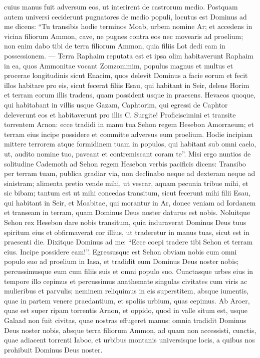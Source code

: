 \begin{biblechapter}
\verse cuius manus fuit adversum eos, ut interirent de castrorum medio. 
\verse Postquam autem universi ceciderunt pugnatores de medio populi, 
\verse locutus est Dominus ad me dicens: 
\verse “Tu transibis hodie terminos Moab, urbem nomine Ar; 
\verse et accedens in vicina filiorum Ammon, cave, ne pugnes contra eos nec movearis ad proelium; non enim dabo tibi de terra filiorum Ammon, quia filiis Lot dedi eam in possessionem. 
\verse — Terra Raphaim reputata est et ipsa olim habitaverunt Raphaim in ea, quos Ammonitae vocant Zomzommim, 
\verse populus magnus et multus et procerae longitudinis sicut Enacim, quos delevit Dominus a facie eorum et fecit illos habitare pro eis, 
\verse sicut fecerat filiis Esau, qui habitant in Seir, delens Horim et terram eorum illis tradens, quam possident usque in praesens. 
\verse Hevaeos quoque, qui habitabant in villis usque Gazam, Caphtorim, qui egressi de Caphtor deleverunt eos et habitaverunt pro illis C.  
\verse Surgite! Proficiscimini et transite torrentem Arnon: ecce tradidi in manu tua Sehon regem Hesebon Amorraeum; et terram eius incipe possidere et committe adversus eum proelium. 
\verse Hodie incipiam mittere terrorem atque formidinem tuam in populos, qui habitant sub omni caelo, ut, audito nomine tuo, paveant et contremiscant coram te”. 
\verse Misi ergo nuntios de solitudine Cademoth ad Sehon regem Hesebon verbis pacificis dicens: 
\verse Transibo per terram tuam, publica gradiar via, non declinabo neque ad dexteram neque ad sinistram; 
\verse alimenta pretio vende mihi, ut vescar, aquam pecunia tribue mihi, et sic bibam; tantum est ut mihi concedas transitum, 
\verse sicut fecerunt mihi filii Esau, qui habitant in Seir, et Moabitae, qui morantur in Ar, donec veniam ad Iordanem et transeam in terram, quam Dominus Deus noster daturus est nobis. 
\verse Noluitque Sehon rex Hesebon dare nobis transitum, quia induraverat Dominus Deus tuus spiritum eius et obfirmaverat cor illius, ut traderetur in manus tuas, sicut est in praesenti die. 
\verse Dixitque Dominus ad me: “Ecce coepi tradere tibi Sehon et terram eius. Incipe possidere eam!”. 
\verse Egressusque est Sehon obviam nobis cum omni populo suo ad proelium in Iasa, 
\verse et tradidit eum Dominus Deus noster nobis; percussimusque eum cum filiis suis et omni populo suo. 
\verse Cunctasque urbes eius in tempore illo cepimus et percussimus anathemate singulas civitates cum viris ac mulieribus et parvulis; neminem reliquimus in eis superstitem, 
\verse absque iumentis, quae in partem venere praedantium, et spoliis urbium, quas cepimus. 
\verse Ab Aroer, quae est super ripam torrentis Arnon, et oppido, quod in valle situm est, usque Galaad non fuit civitas, quae nostras effugeret manus: omnia tradidit Dominus Deus noster nobis, 
\verse absque terra filiorum Ammon, ad quam non accessisti, cunctis, quae adiacent torrenti Iaboc, et urbibus montanis universisque locis, a quibus nos prohibuit Dominus Deus noster. 
\end{biblechapter}

